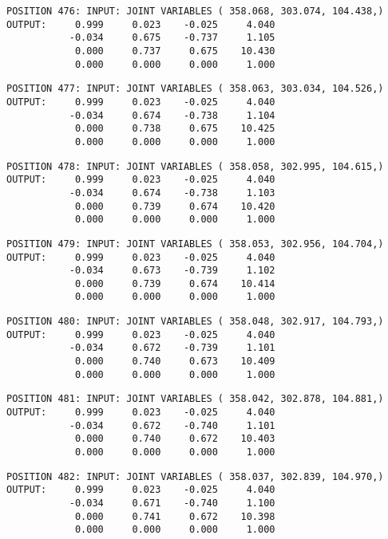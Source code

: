 \begin{verbatim}
POSITION 476: INPUT: JOINT VARIABLES ( 358.068, 303.074, 104.438,)
OUTPUT:     0.999     0.023    -0.025     4.040
           -0.034     0.675    -0.737     1.105
            0.000     0.737     0.675    10.430
            0.000     0.000     0.000     1.000
\end{verbatim} \pagebreak[1]\begin{verbatim}
POSITION 477: INPUT: JOINT VARIABLES ( 358.063, 303.034, 104.526,)
OUTPUT:     0.999     0.023    -0.025     4.040
           -0.034     0.674    -0.738     1.104
            0.000     0.738     0.675    10.425
            0.000     0.000     0.000     1.000
\end{verbatim} \pagebreak[1]\begin{verbatim}
POSITION 478: INPUT: JOINT VARIABLES ( 358.058, 302.995, 104.615,)
OUTPUT:     0.999     0.023    -0.025     4.040
           -0.034     0.674    -0.738     1.103
            0.000     0.739     0.674    10.420
            0.000     0.000     0.000     1.000
\end{verbatim} \pagebreak[1]\begin{verbatim}
POSITION 479: INPUT: JOINT VARIABLES ( 358.053, 302.956, 104.704,)
OUTPUT:     0.999     0.023    -0.025     4.040
           -0.034     0.673    -0.739     1.102
            0.000     0.739     0.674    10.414
            0.000     0.000     0.000     1.000
\end{verbatim} \pagebreak[1]\begin{verbatim}
POSITION 480: INPUT: JOINT VARIABLES ( 358.048, 302.917, 104.793,)
OUTPUT:     0.999     0.023    -0.025     4.040
           -0.034     0.672    -0.739     1.101
            0.000     0.740     0.673    10.409
            0.000     0.000     0.000     1.000
\end{verbatim} \pagebreak[1]\begin{verbatim}
POSITION 481: INPUT: JOINT VARIABLES ( 358.042, 302.878, 104.881,)
OUTPUT:     0.999     0.023    -0.025     4.040
           -0.034     0.672    -0.740     1.101
            0.000     0.740     0.672    10.403
            0.000     0.000     0.000     1.000
\end{verbatim} \pagebreak[1]\begin{verbatim}
POSITION 482: INPUT: JOINT VARIABLES ( 358.037, 302.839, 104.970,)
OUTPUT:     0.999     0.023    -0.025     4.040
           -0.034     0.671    -0.740     1.100
            0.000     0.741     0.672    10.398
            0.000     0.000     0.000     1.000
\end{verbatim} \pagebreak[1]\begin{verbatim}

\end{verbatim}

